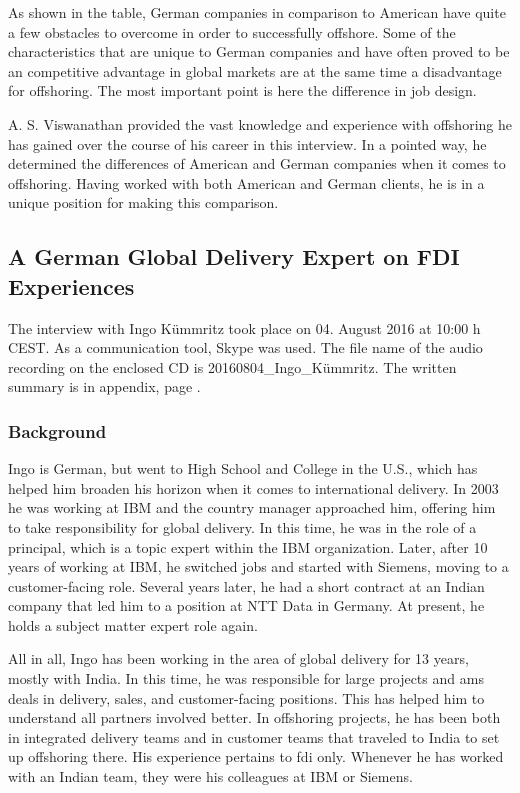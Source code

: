 As shown in the table, German companies in comparison to American have quite a few obstacles to overcome in order to successfully offshore. Some of the characteristics that are unique to German companies and have often proved to be an competitive advantage in global markets are at the same time a disadvantage for offshoring. The most important point is here the difference in job design. 

A. S. Viswanathan provided the vast knowledge and experience with offshoring he has gained over the course of his career in this interview. In a pointed way, he determined the differences of American and German companies when it comes to offshoring. Having worked with both American and German clients, he is in a unique position for making this comparison.

\subsection{A German Global Delivery Expert on FDI Experiences}
The interview with Ingo K\"ummritz took place on 04. August 2016 at 10:00 h CEST. As a communication tool, Skype was used. The file name of the audio recording on the enclosed CD is 20160804\_Ingo\_K\"ummritz. The written summary is in appendix, page \pageref{int:Ingo}.

\subsubsection{Background}
Ingo is German, but went to High School and College in the U.S., which has helped him broaden his horizon when it comes to international delivery. In 2003 he was working at IBM and the country manager approached him, offering him to take responsibility for global delivery. In this time, he was in the role of a principal, which is a topic expert within the IBM organization. Later, after 10 years of working at IBM, he switched jobs and started with Siemens, moving to a customer-facing role. Several years later, he had a short contract at an Indian company that led him to a position at NTT Data in Germany. At present, he holds a subject matter expert role again.

All in all, Ingo has been working in the area of global delivery for 13 years, mostly with India. In this time, he was responsible for large projects and \gls{ams} deals in delivery, sales, and customer-facing positions. This has helped him to understand all partners involved better. In offshoring projects, he has been both in integrated delivery teams and in customer teams that traveled to India to set up offshoring there. His experience pertains to \gls{fdi} only. Whenever he has worked with an Indian team, they were his colleagues at IBM or Siemens.

